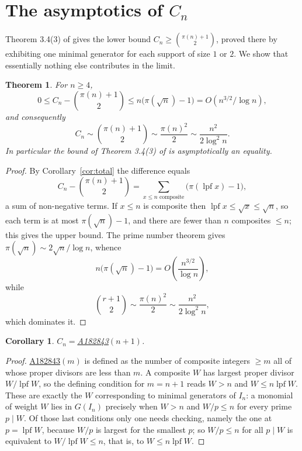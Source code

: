 \documentclass[a4paper,11pt,oneside,reqno]{amsart}
\theoremstyle{definition}
\theoremstyle{remark}
\theoremstyle{plain}
\newtheorem{theorem}[definition]{Theorem}
\newtheorem{corollary}[definition]{Corollary}
\newcommand{\lpf}{\operatorname{lpf}}
\newcommand{\seqnum}[1]{\href{https://oeis.org/#1}{\underline{#1}}}
\begin{document}
\section{The asymptotics of \texorpdfstring{\(C_n\)}{C\_n}}\label{sec:asymptotics}

Theorem 3.4(3) of \cite{Snellman2000} gives the lower bound
\(C_n \ge \binom{\pi(n)+1}{2}\), proved there by exhibiting one minimal generator
for each support of size \(1\) or \(2\). We show that essentially nothing else
contributes in the limit.

\begin{theorem}\label{thm:asymp}
  For \(n \ge 4\),
  \begin{equation}\label{eq:Cnbounds}
    0 \le C_n-\binom{\pi(n)+1}{2} \le n\bigl(\pi(\sqrt n)-1\bigr)
      =O\!\left(n^{3/2}/\log n\right),
  \end{equation}
  and consequently
  \begin{equation}\label{eq:Cnasymp}
    C_n \sim \binom{\pi(n)+1}{2} \sim \frac{\pi(n)^{2}}{2} \sim \frac{n^{2}}{2\log^{2}n}.
  \end{equation}
  In particular the bound of Theorem 3.4(3) of \cite{Snellman2000} is
  asymptotically an equality.
\end{theorem}

\begin{proof}
  By Corollary~\ref{cor:total} the difference equals
  \[
    C_n-\binom{\pi(n)+1}{2} = \sum_{x \le n\text{ composite}}\bigl(\pi(\lpf x)-1\bigr),
  \]
  a sum of non-negative terms. If \(x \le n\) is composite then
  \(\lpf x \le \sqrt x \le \sqrt n\), so each term is at most \(\pi(\sqrt n)-1\), and
  there are fewer than \(n\) composites \(\le n\); this gives the upper bound.
  The prime number theorem gives \(\pi(\sqrt n) \sim 2\sqrt n/\log n\), whence
  \[
    n\bigl(\pi(\sqrt n)-1\bigr) = O\!\left(\frac{n^{3/2}}{\log n}\right),
  \]
  while
  \[
    \binom{r+1}{2} \sim \frac{\pi(n)^{2}}{2} \sim \frac{n^{2}}{2\log^{2}n},
  \]
  which dominates it.
\end{proof}

\begin{corollary}
  \(C_n=\)\;\seqnum{A182843}\((n+1)\).
\end{corollary}

\begin{proof}
  \seqnum{A182843}\((m)\) is defined as the number of composite integers
  \(\ge m\) all of whose proper divisors are less than \(m\). A composite \(W\)
  has largest proper divisor \(W/\lpf W\), so the defining condition for
  \(m = n+1\) reads \(W > n\) and \(W \le n\lpf W\). These are exactly the \(W\)
  corresponding to minimal generators of \(I_n\): a monomial of weight \(W\)
  lies in \(G(I_n)\) precisely when \(W > n\) and \(W/p \le n\) for every prime
  \(p \mid W\). Of those last conditions only one needs checking, namely the one
  at \(p = \lpf W\), because \(W/p\) is largest for the smallest \(p\); so
  \(W/p \le n\) for all \(p \mid W\) is equivalent to \(W/\lpf W \le n\), that is,
  to \(W \le n\lpf W\).
\end{proof}
\end{document}
